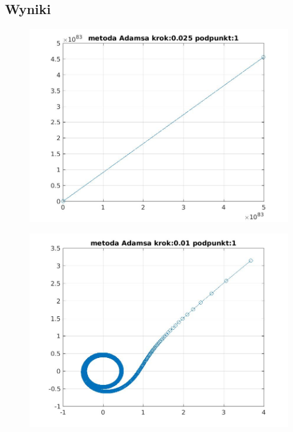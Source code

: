 \documentclass[a4paper, 11pt]{article}
\begin{document}
\subsection{Wyniki}
\begin{figure}[H]
\centering
\includegraphics[width = 15cm]{2d/metoda Adamsa krok:0,025 podpunkt:1.jpg}
\end{figure}
\begin{figure}[H]
\centering
\includegraphics[width = 15cm]{2d/metoda Adamsa krok:0,01 podpunkt:1.jpg}
\end{figure}
\end{document}
